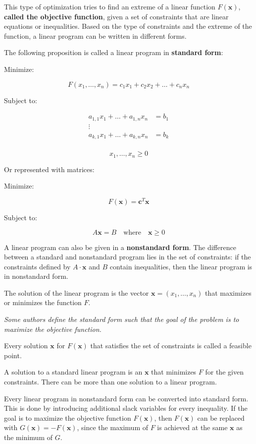 \documentclass[11pt]{article}
\begin{document}
    This type of optimization tries to find an extreme of a linear function
\(F(\pmb{x})\), \textbf{called the objective function}, given a set of
constraints that are linear equations or inequalities. Based on the type
of constraints and the extreme of the function, a linear program can be
written in different forms.

The following proposition is called a linear program in \textbf{standard
form}:

Minimize:

\[
F(x_1, \ldots, x_n) = c_1 x_1 + c_2 x_2 + \ldots + c_n x_n
\]

Subject to:

\[
\begin{aligned}
a_{1,1}x_1 + \ldots + a_{1,n}x_n &= b_1 \\
\vdots \\
a_{k,1}x_1 + \ldots + a_{k,n}x_n &= b_k \\
\end{aligned}
\]

\[
x_1, \ldots, x_n \geq 0
\]

Or represented with matrices:

Minimize:

\[
F(\pmb{x}) = \pmb{c}^T \pmb{x}
\]

Subject to:

\[
A\pmb{x} = B \quad \text{where} \quad \pmb{x} \geq 0
\]

A linear program can also be given in a \textbf{nonstandard form}. The
difference between a standard and nonstandard program lies in the set of
constraints: if the constraints defined by \(A \cdot \pmb{x}\) and \(B\)
contain inequalities, then the linear program is in nonstandard form.

The solution of the linear program is the vector
\(\pmb{x} = (x_1, \ldots, x_n)\) that maximizes or minimizes the
function \(F\).

\emph{Some authors define the standard form such that the goal of the
problem is to maximize the objective function.}

Every solution \(\pmb{x}\) for \(F(\pmb{x})\) that satisfies the set of
constraints is called a feasible point.

A solution to a standard linear program is an \(\pmb{x}\) that minimizes
\(F\) for the given constraints. There can be more than one solution to
a linear program.

Every linear program in nonstandard form can be converted into standard
form. This is done by introducing additional slack variables for every
inequality. If the goal is to maximize the objective function
\(F(\pmb{x})\), then \(F(\pmb{x})\) can be replaced with
\(G(\pmb{x}) = -F(\pmb{x})\), since the maximum of \(F\) is achieved at
the same \(\pmb{x}\) as the minimum of \(G\).
\end{document}
